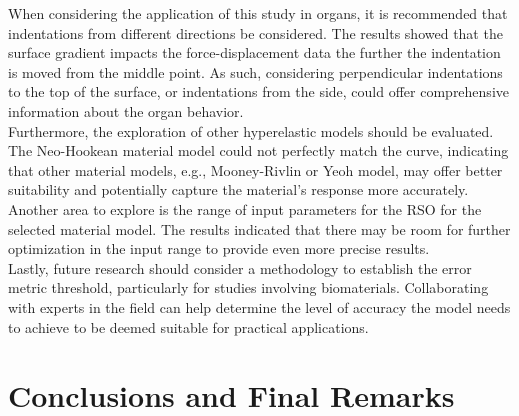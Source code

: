 When considering the application of this study in organs, it is recommended that indentations from 
different directions be considered. The results showed that the surface gradient impacts the force-displacement data the
further the indentation is moved from the middle point. As such, considering perpendicular indentations to the top 
of the surface, or indentations from the side, could offer comprehensive information about the organ behavior.\\

Furthermore, the exploration of other hyperelastic models should be evaluated. The Neo-Hookean material 
model could not perfectly match the curve, indicating that other material models, e.g., Mooney-Rivlin or Yeoh model, may 
offer better suitability and potentially capture the material's response more accurately. Another area to explore is the range
 of input parameters for the RSO for the selected material model. The results indicated that there may be room 
for further optimization in the input range to provide even more precise results.\\

Lastly, future research should consider a methodology to establish the error metric threshold, particularly for studies
involving biomaterials. Collaborating with experts in the field can help determine the level of accuracy the model 
needs to achieve to be deemed suitable for practical applications.

\section{Conclusions and Final Remarks}



